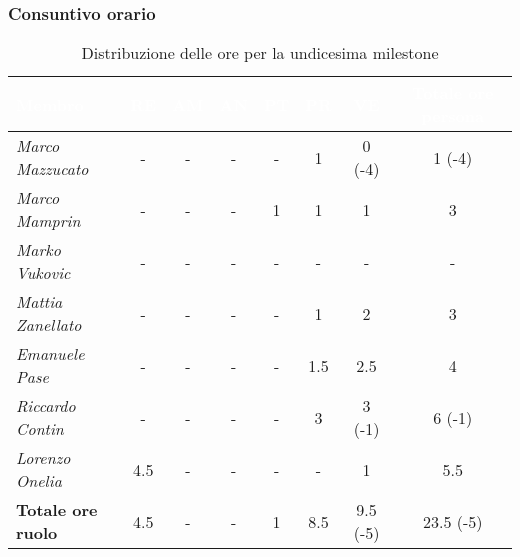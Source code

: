 \subsubsection{Consuntivo orario}
\begin{table}[H]
    \renewcommand\arraystretch{1.5}
    \small
    \centering
        \begin{tabular}{|l|c|c|c|c|c|c|c|}
            \hline
            \rowcolor[HTML]{036400}
            \textcolor{white}{\textbf{Membro}} & \multicolumn{1}{c|}{\textcolor{white}{\textbf{RE}}} & \multicolumn{1}{c|}{\textcolor{white}{\textbf{AM}}} & \multicolumn{1}{c|}{\textcolor{white}{\textbf{AN}}} & \multicolumn{1}{c|}{\textcolor{white}{\textbf{PT}}} & \multicolumn{1}{c|}{\textcolor{white}{\textbf{PR}}} & \multicolumn{1}{c|}{\textcolor{white}{\textbf{VE}}} & \multicolumn{1}{c|}{\textcolor{white}{\textbf{Totale ore persona}}} \\ \hline
            \rowcolor[HTML]{EFEFEF}\textit{Marco Mazzucato}  & -         & -        & -          & -        & 1        & 0 (-4)       & 1 (-4)    \\ \hline
            \rowcolor[HTML]{C0C0C0}\textit{Marco Mamprin}    & -         & -        & -          & 1        & 1        & 1            & 3   \\ \hline
            \rowcolor[HTML]{EFEFEF}\textit{Marko Vukovic}    & -         & -        & -          & -        & -        & -            & -           \\ \hline
            \rowcolor[HTML]{C0C0C0}\textit{Mattia Zanellato} & -         & -        & -          & -        & 1        & 2            & 3       \\ \hline
            \rowcolor[HTML]{EFEFEF}\textit{Emanuele Pase}    & -         & -        & -          & -        & 1.5      & 2.5          & 4      \\ \hline
            \rowcolor[HTML]{C0C0C0}\textit{Riccardo Contin}  & -         & -        & -          & -        & 3        & 3 (-1)       & 6 (-1)           \\ \hline
            \rowcolor[HTML]{EFEFEF}\textit{Lorenzo Onelia}   & 4.5       & -        & -          & -        & -        & 1            & 5.5        \\ \hline
            \rowcolor[HTML]{C0C0C0}\textbf{Totale ore ruolo} & 4.5       & -        & -          & 1        & 8.5      & 9.5 (-5)     & 23.5 (-5)  \\ \hline
        \end{tabular}
    \caption{Distribuzione delle ore per la undicesima milestone}
\end{table}

